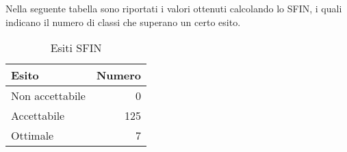 Nella seguente tabella sono riportati i valori ottenuti calcolando lo SFIN, i quali indicano il numero di classi che superano un certo esito.
\begin{table}[h]
	\centering
	\begin{tabular}{l r}
		\hline
		\rule[-0.3cm]{0cm}{0.8cm}
		\textbf{Esito} & \textbf{Numero} \\
		\hline
		\rule[0cm]{0cm}{0.4cm}
		Non accettabile & 0 \\
		\rule[0cm]{0cm}{0.4cm}
		Accettabile & 125 \\
		\rule[0cm]{0cm}{0.4cm}
		Ottimale & 7 \\
		\hline
  \end{tabular}
	\caption{Esiti SFIN}
\end{table}
